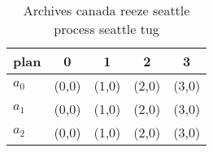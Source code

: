 \documentclass[a4paper]{article}
\begin{document}
\begin{table}
\begin{adjustbox}{width=0.6\columnwidth}
\begin{tabular}{|l|l|l|l|l|}
\hline
\textbf{plan} & \multicolumn{1}{c|}{\textbf{0}} & \multicolumn{1}{c|}{\textbf{1}} & \multicolumn{1}{c|}{\textbf{2}} & \multicolumn{1}{c|}{\textbf{3}} \\ \hline
\textbf{$a_0$}  & (0,0) & (1,0) & (2,0) & (3,0) \\ \hline
\textbf{$a_1$}  & (0,0) & (1,0) & (2,0) & (3,0) \\ \hline
\textbf{$a_2$}  & (0,0) & (1,0) & (2,0) & (3,0) \\ \hline
\end{tabular}
\end{adjustbox}
\caption{Archives canada reeze seattle process seattle tug
}
\end{table}
\end{document}
